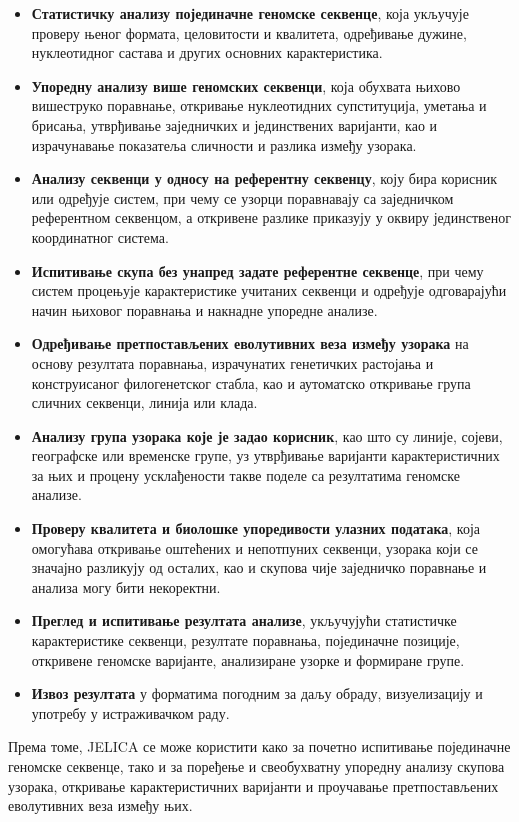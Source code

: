 \documentclass[12pt,oneside]{memoir}
\begin{document}
\begin{itemize}
    \item \textbf{Статистичку анализу појединачне геномске секвенце}, која укључује проверу њеног формата, целовитости и квалитета, одређивање дужине, нуклеотидног састава и других основних карактеристика.
    \item \textbf{Упоредну анализу више геномских секвенци}, која обухвата њихово вишеструко поравнање, откривање нуклеотидних супституција, уметања и брисања, утврђивање заједничких и јединствених варијанти, као и израчунавање показатеља сличности и разлика између узорака.
    \item \textbf{Анализу секвенци у односу на референтну секвенцу}, коју бира корисник или одређује систем, при чему се узорци поравнавају са заједничком референтном секвенцом, а откривене разлике приказују у оквиру јединственог координатног система.
    \item \textbf{Испитивање скупа без унапред задате референтне секвенце}, при чему систем процењује карактеристике учитаних секвенци и одређује одговарајући начин њиховог поравнања и накнадне упоредне анализе.
    \item \textbf{Одређивање претпостављених еволутивних веза између узорака} на основу резултата поравнања, израчунатих генетичких растојања и конструисаног филогенетског стабла, као и аутоматско откривање група сличних секвенци, линија или клада.
    \item \textbf{Анализу група узорака које је задао корисник}, као што су линије, сојеви, географске или временске групе, уз утврђивање варијанти карактеристичних за њих и процену усклађености такве поделе са резултатима геномске анализе.
    \item \textbf{Проверу квалитета и биолошке упоредивости улазних података}, која омогућава откривање оштећених и непотпуних секвенци, узорака који се значајно разликују од осталих, као и скупова чије заједничко поравнање и анализа могу бити некоректни.
    \item \textbf{Преглед и испитивање резултата анализе}, укључујући статистичке карактеристике секвенци, резултате поравнања, појединачне позиције, откривене геномске варијанте, анализиране узорке и формиране групе.
    \item \textbf{Извоз резултата} у форматима погодним за даљу обраду, визуелизацију и употребу у истраживачком раду.
\end{itemize}

Према томе, JELICA се може користити како за почетно испитивање појединачне геномске секвенце, тако и за поређење и свеобухватну упоредну анализу скупова узорака, откривање карактеристичних варијанти и проучавање претпостављених еволутивних веза између њих.
\end{document}
